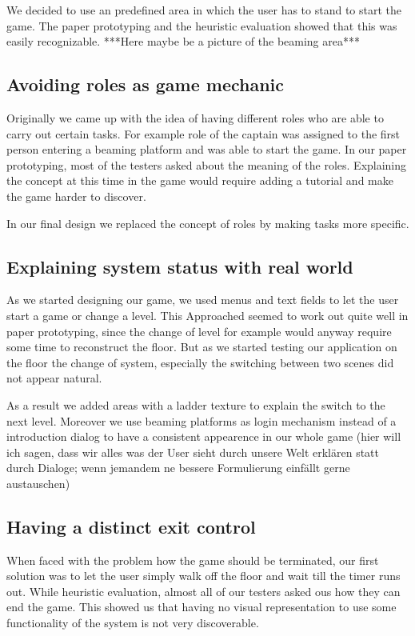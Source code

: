 \documentclass{sigchi}
\begin{document}
We decided to use an predefined area in which the user has to stand to start the game. The paper prototyping and the heuristic evaluation showed that this was easily recognizable. 
***Here maybe be a picture of the beaming area*** 


\subsection{Avoiding roles as game mechanic}
\vspace{1mm}
Originally we came up with the idea of having different roles who are able to carry out certain tasks. For example role of the captain was assigned to the first person entering a beaming platform and was able to start the game. In our paper prototyping, most of the testers asked about the meaning of the roles. Explaining the concept at this time in the game would require adding a tutorial and make the game harder to discover. 

In our final design we replaced the concept of roles by making tasks more specific.   

\subsection{Explaining system status with real world}
\vspace{1mm}
As we started designing our game, we used menus and text fields to let the user start a game or change a level. This Approached seemed to work out quite well in paper prototyping, since the change of level for example would anyway require some time to reconstruct the floor. But as we started testing our application on the floor the change of system, especially the switching between two scenes did not appear natural. 

As a result we added areas with a ladder texture to explain the switch to the next level. Moreover we use beaming platforms as login mechanism instead of a introduction dialog to have a consistent appearence in our whole game (hier will ich sagen, dass wir alles was der User sieht durch unsere Welt erklären statt durch Dialoge; wenn jemandem ne bessere Formulierung einfällt gerne austauschen)

\subsection{Having a distinct exit control}
\vspace{1mm}
When faced with the problem how the game should be terminated, our first solution was to let the user simply walk off the floor and wait till the timer runs out. While heuristic evaluation, almost all of our testers asked ous how they can end the game. This showed us that having no visual representation to use some functionality of the system is not very discoverable. 
\end{document}
